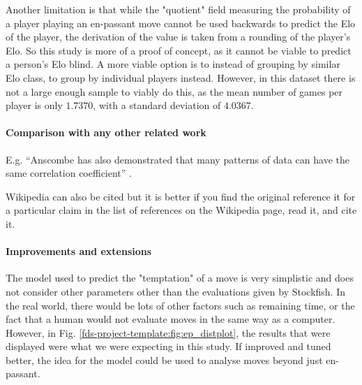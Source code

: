 \documentclass[10pt,a4paper]{article}
\begin{document}
\begin{multicols}{2}
Another limitation is that while the "quotient"  field measuring the probability of a player playing an en-passant move cannot be used backwards to predict the Elo of the player, the derivation of the value is taken from a rounding of the player's Elo. So this study is more of a proof of concept, as it cannot be viable to predict a person's Elo blind. A more viable option is to instead of grouping by similar Elo class, to group by individual players instead. However, in this dataset there is not a large enough sample to viably do this, as the mean number of games per player is only $1.7370$, with a standard deviation of $4.0367$.

\paragraph{Comparison with any other related work}
E.g. ``Anscombe has also demonstrated that many patterns of data can
have the same correlation coefficient'' \cite{anscombe1973graphs}.

Wikipedia can also be cited but it is better if you find the original
reference it for a particular claim in the list of references on the
Wikipedia page, read it, and cite it.


\paragraph{Improvements and extensions}

The model used to predict the "temptation" of a move is very simplistic and does not consider other parameters other than the evaluations given by Stockfish. In the real world, there would be lots of other factors such as remaining time, or the fact that a human would not evaluate moves in the same way as a computer. However, in Fig. \ref{fds-project-template:fig:ep_distplot}, the results that were displayed were what we were expecting in this study. If improved and tuned better, the idea for the model could be used to analyse moves beyond just en-passant.

\end{multicols}

\printbibliography
\end{document}
